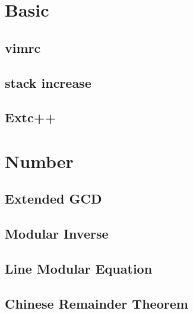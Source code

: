 \documentclass[10pt,twocolumn,oneside]{article}
\begin{document}
    \pagestyle{fancy}
    \fancyfoot{}
    \fancyhead[R]{\thepage}
    \renewcommand{\headrulewidth}{0.4pt}
    \renewcommand{\contentsname}{Codebook} 

    \scriptsize
    \tableofcontents

    \newpage

    \section{Basic}
    \subsection{vimrc}
    
    \subsection{stack increase}
    
    \subsection{Extc++}
    
    \newpage


    \section{Number}
    \subsection{Extended GCD}
    
    \subsection{Modular Inverse}
    
    \subsection{Line Modular Equation}
    
    \subsection{Chinese Remainder Theorem}
    
\end{document}
